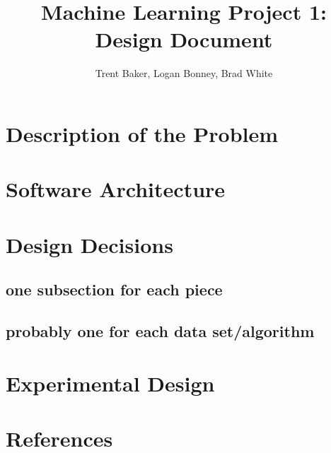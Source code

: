 \documentclass[10pt,a4paper]{article}
\author{Trent Baker, Logan Bonney, Brad White}
\title{Machine Learning Project 1: Design Document}
\date{}
\begin{document}
\maketitle
\section{Description of the Problem}

\section{Software Architecture}

\section{Design Decisions}

\subsection{one subsection for each piece}
	
\subsection{probably one for each data set/algorithm}

\section{Experimental Design}

\section{References}
\end{document}
